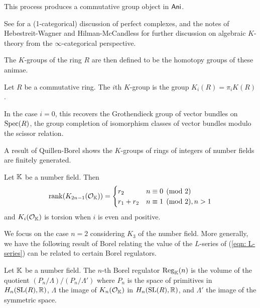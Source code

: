 This process produces a commutative group object in $\mathsf{Ani}$.
\begin{remark}
    See \cite[\href{https://stacks.math.columbia.edu/tag/0656}{Tag 0656}]{stacks-project} for a (1-categorical) discussion of perfect complexes, and the notes of Hebestreit-Wagner \cite{HW21} and Hilman-McCandless \cite{HM24} for further discussion on algebraic $K$-theory from the $\infty$-categorical perspective. 
\end{remark}
The $K$-groups of the ring $R$ are then defined to be the homotopy groups of these animae.
\begin{definition}\label{def: K-groups}
    Let $R$ be a commutative ring. The $i$th $K$-group is the group $K_{i}(R)=\pi_{i}K(R)$.
\end{definition}
\begin{remark}
    In the case $i=0$, this recovers the Grothendieck group of vector bundles on $\operatorname{Spec}(R)$, the group completion of isomorphism classes of vector bundles modulo the scissor relation. 
\end{remark}
A result of Quillen-Borel shows the $K$-groups of rings of integers of number fields are finitely generated. 
\begin{theorem}\label{thm: ranks of K-groups of number fields}
    Let $\mathbb{K}$ be a number field. Then 
    $$\mathrm{rank}(K_{2n-1}(\mathcal{O}_{\mathbb{K}}))=\begin{cases}
        r_{2} & n\equiv0\pmod{2} \\ 
        r_{1}+r_{2} & n\equiv1\pmod{2}, n>1
    \end{cases}$$
    and $K_{i}(\mathcal{O}_{\mathbb{K}})$ is torsion when $i$ is even and positive. 
\end{theorem}
We focus on the case $n=2$ considering $K_{3}$ of the number field. More generally, we have the following result of Borel relating the value of the $L$-series of (\ref{eqn: L-series}) can be related to certain Borel regulators. 
\begin{definition}\label{def: Borel regulator}
    Let $\mathbb{K}$ be a number field. The $n$-th Borel regulator $\mathrm{Reg}_{\mathbb{K}}(n)$ is the volume of the quotient $(P_{n}/\Lambda)/(P_{n}/\Lambda')$ where $P_{n}$ is the space of primitives in $H_{n}(\mathrm{SL}(R),\mathbb{R})$, $\Lambda$ the image of $K_{n}(\mathcal{O}_{\mathbb{K}})$ in $H_{n}(\mathrm{SL}(R),\mathbb{R})$, and $\Lambda'$ the image of the symmetric space. 
\end{definition}
